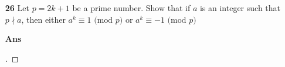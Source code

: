 \documentclass[paper=usletter, fontsize=12pt]{article}
\begin{document}
\begin{itemize}
\begin{itemize}
            \item[\textbf{26}] Let $p=2k+1$ be a prime number. Show that if $a$
            is an integer such that $p \nmid a$, then either $a^k \equiv 1
            \text{ (mod  $p$)}$ or $a^k \equiv -1 \text{ (mod  $p$)}$
            \item[\textbf{Ans}]
            \begin{proof}[\unskip\nopunct]
            \end{proof}
            \vspace{0.2in}

        \end{itemize}

    \end{itemize}
\end{document}
